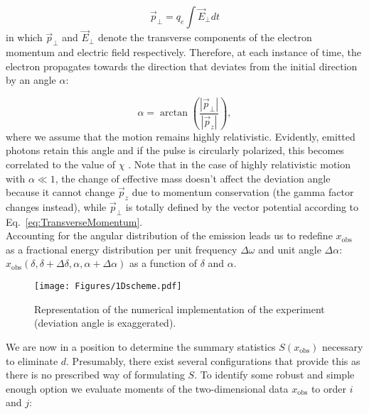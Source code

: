 \documentclass[%
 reprint,
 amsmath,amssymb,
 aps,
]{revtex4-2}
\begin{document}
\begin{equation} \label{eq:TransverseMomentum}
\vec{p}_{\perp} = q_e \int \vec{E}_{\perp} dt
\end{equation}
in which $\vec{p}_{\perp}$ and $\vec{E}_{\perp}$ denote the transverse components of the electron momentum and electric field respectively. Therefore, at each instance of time, the electron propagates towards the direction that deviates from the initial direction by an angle $\alpha$:

\begin{equation} \label{eq:Alpha}
    \alpha = \arctan \left( \frac{|\vec{p}_{\perp}|}{|\vec{p}_z|} \right),
\end{equation}
where we assume that the motion remains highly relativistic. Evidently, emitted photons retain this angle and if the pulse is circularly polarized, this becomes correlated to the value of $\chi$ \cite{olofsson2022attaining}. 
Note that in the case of highly relativistic motion with $\alpha \ll 1$, the change of effective mass doesn't affect the deviation angle because it cannot change $\vec{p}_z$ due to momentum conservation (the gamma factor changes instead), while $\vec{p}_\perp$ is totally defined by the vector potential according to Eq.~\eqref{eq:TransverseMomentum}. \\

Accounting for the angular distribution of the emission leads us to redefine $x_{\text{obs}}$ as a fractional energy distribution per unit frequency $\Delta \omega$ and unit angle $\Delta \alpha$: $x_{\text{obs}}(\delta, \delta+\Delta \delta, \alpha, \alpha+\Delta \alpha)$ as a function of $\delta$ and $\alpha$. \\

\begin{figure}[ht] 
\centering
\texttt{[image: Figures/1Dscheme.pdf]}
\caption{Representation of the numerical implementation of the experiment (deviation angle is exaggerated).}
\label{fig:1Dscheme} 
\end{figure}
We are now in a position to determine the summary statistics $S(x_{\text{obs}})$ necessary to eliminate $d$. Presumably, there exist several configurations that provide this as there is no prescribed way of formulating $S$. To identify some robust and simple enough option we evaluate moments of the two-dimensional data $x_{\text{obs}}$ to order $i$ and $j$:
\end{document}
